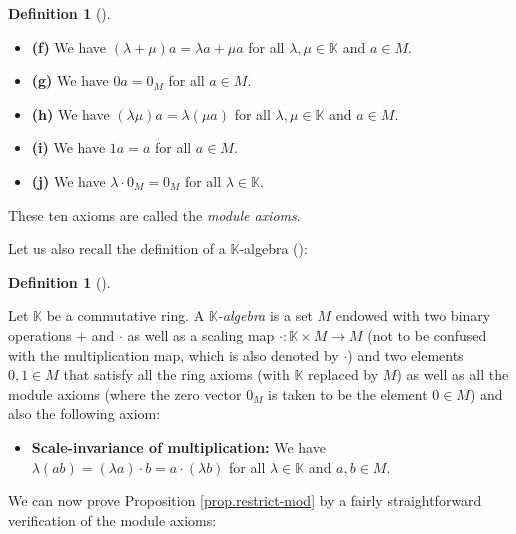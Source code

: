 \documentclass[numbers=enddot,12pt,final,onecolumn,notitlepage]{scrartcl}%
\theoremstyle{definition}
\newtheorem{defi}[theo]{Definition}
\newenvironment{definition}[1][]
{\begin{defi}[#1]\begin{leftbar}}
{\end{leftbar}\end{defi}}
\begin{document}
\begin{definition}
\begin{itemize}
\item \textbf{(f)} We have $\left(  \lambda+\mu\right)  a=\lambda a+\mu a$ for
all $\lambda,\mu\in\mathbb{K}$ and $a\in M$.

\item \textbf{(g)} We have $0a=0_{M}$ for all $a\in M$.

\item \textbf{(h)} We have $\left(  \lambda\mu\right)  a=\lambda\left(  \mu
a\right)  $ for all $\lambda,\mu\in\mathbb{K}$ and $a\in M$.

\item \textbf{(i)} We have $1a=a$ for all $a\in M$.

\item \textbf{(j)} We have $\lambda\cdot0_{M}=0_{M}$ for all $\lambda
\in\mathbb{K}$.
\end{itemize}

\noindent These ten axioms are called the \textit{module axioms}.
\end{definition}

Let us also recall the definition of a $\mathbb{K}$-algebra (\cite[Definition
6.9.1]{19s}):

\begin{definition}
\label{def.K-alg.K-alg.short-def}Let $\mathbb{K}$ be a commutative ring. A
$\mathbb{K}$\textit{-algebra} is a set $M$ endowed with two binary operations
$+$ and $\cdot$ as well as a scaling map $\cdot:\mathbb{K}\times M\rightarrow
M$ (not to be confused with the multiplication map, which is also denoted by
$\cdot$) and two elements $0,1\in M$ that satisfy all the ring axioms (with
$\mathbb{K}$ replaced by $M$) as well as all the module axioms (where the zero
vector $0_{M}$ is taken to be the element $0\in M$) and also the following axiom:

\begin{itemize}
\item \textbf{Scale-invariance of multiplication:} We have $\lambda\left(
ab\right)  =\left(  \lambda a\right)  \cdot b=a\cdot\left(  \lambda b\right)
$ for all $\lambda\in\mathbb{K}$ and $a,b\in M$.
\end{itemize}
\end{definition}

We can now prove Proposition \ref{prop.restrict-mod} by a fairly
straightforward verification of the module axioms:
\end{document}
